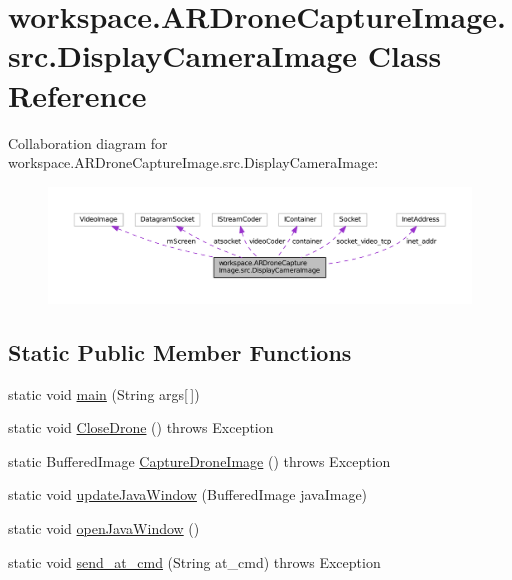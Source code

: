 \hypertarget{classworkspace_1_1_a_r_drone_capture_image_1_1src_1_1_display_camera_image}{}\section{workspace.\+A\+R\+Drone\+Capture\+Image.\+src.\+Display\+Camera\+Image Class Reference}
\label{classworkspace_1_1_a_r_drone_capture_image_1_1src_1_1_display_camera_image}


Collaboration diagram for workspace.\+A\+R\+Drone\+Capture\+Image.\+src.\+Display\+Camera\+Image\+:\nopagebreak
\begin{figure}[H]
\begin{center}
\leavevmode
\includegraphics[width=350pt]{classworkspace_1_1_a_r_drone_capture_image_1_1src_1_1_display_camera_image__coll__graph}
\end{center}
\end{figure}
\subsection*{Static Public Member Functions}
\begin{DoxyCompactItemize}
\item 
static void \hyperlink{classworkspace_1_1_a_r_drone_capture_image_1_1src_1_1_display_camera_image_aefb4b3ec28e6bb1e39bedbb8f67cf4b9}{main} (String args\mbox{[}$\,$\mbox{]})
\item 
static void \hyperlink{classworkspace_1_1_a_r_drone_capture_image_1_1src_1_1_display_camera_image_a4131635745cfbdb78969b00aa7f87b6b}{Close\+Drone} ()  throws Exception 
\item 
static Buffered\+Image \hyperlink{classworkspace_1_1_a_r_drone_capture_image_1_1src_1_1_display_camera_image_ada98bede132289381d6895d2285c367f}{Capture\+Drone\+Image} ()  throws Exception 
\item 
static void \hyperlink{classworkspace_1_1_a_r_drone_capture_image_1_1src_1_1_display_camera_image_abbd4c5447bc2c87cd929f1cd511d666a}{update\+Java\+Window} (Buffered\+Image java\+Image)
\item 
static void \hyperlink{classworkspace_1_1_a_r_drone_capture_image_1_1src_1_1_display_camera_image_a652d4112351613f75c3976bf094231f1}{open\+Java\+Window} ()
\item 
static void \hyperlink{classworkspace_1_1_a_r_drone_capture_image_1_1src_1_1_display_camera_image_a58974c5268ea5b9552a9d70a69eb4ed4}{send\+\_\+at\+\_\+cmd} (String at\+\_\+cmd)  throws Exception 
\end{DoxyCompactItemize}
